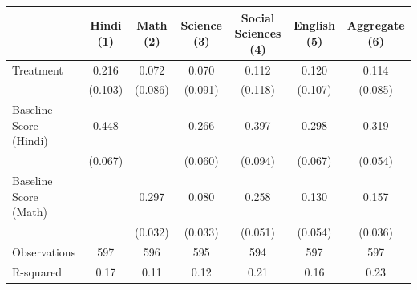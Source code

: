 \begin{table}[t]
\fontsize{12.0pt}{14.0pt}\selectfont
\begin{tabular*}{\linewidth}{@{\extracolsep{\fill}}lcccccc}
\toprule
{\mdseries  } & {\mdseries Hindi (1)} & {\mdseries Math (2)} & {\mdseries Science (3)} & {\mdseries Social Sciences (4)} & {\mdseries English (5)} & {\mdseries Aggregate (6)} \\ 
\midrule\addlinespace[2.5pt]
Treatment & 0.216 & 0.072 & 0.070 & 0.112 & 0.120 & 0.114 \\ 
 & (0.103) & (0.086) & (0.091) & (0.118) & (0.107) & (0.085) \\ 
Baseline Score (Hindi) & 0.448 &  & 0.266 & 0.397 & 0.298 & 0.319 \\ 
 & (0.067) &  & (0.060) & (0.094) & (0.067) & (0.054) \\ 
Baseline Score (Math) &  & 0.297 & 0.080 & 0.258 & 0.130 & 0.157 \\ 
{} & {} & {(0.032)} & {(0.033)} & {(0.051)} & {(0.054)} & {(0.036)} \\ 
Observations & 597 & 596 & 595 & 594 & 597 & 597 \\ 
R-squared & 0.17 & 0.11 & 0.12 & 0.21 & 0.16 & 0.23 \\ 
\bottomrule
\end{tabular*}
\end{table}

